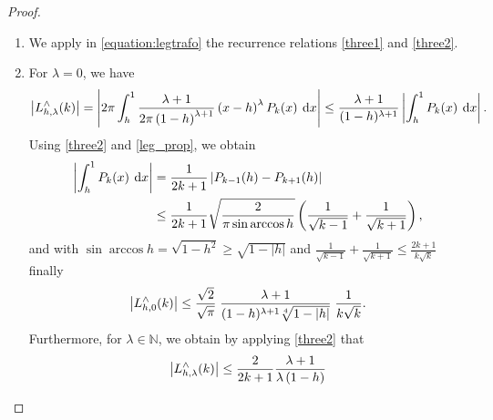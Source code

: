 \documentclass[11pt,a4paper,twoside,bibtotoc]{scrartcl}
\theoremstyle{plain}
\theoremstyle{definition}
\theoremstyle{remark}
\newcommand{\N}{\ensuremath{\mathbb{N}}}
\newcommand{\fun}[2]{\ensuremath{#1{\hspace{-0.4ex}}\left(#2\right)}}
\newcommand{\dx}{\text{\rm{d}}}
\numberwithin{equation}{section}
\numberwithin{table}{section}
\numberwithin{figure}{section}
\begin{document}
\begin{proof}
  ${}^{}$\\[-2ex]
  \begin{enumerate}
  \item We apply in \eqref{equation:legtrafo} the recurrence relations \eqref{three1} and \eqref{three2}.
  \item For $\lambda=0$, we have
    \begin{equation*}
      \left|\fun{L_{h,\lambda}^{\wedge}}{k}\right| 
      = \left| 2\pi \int_{h}^1 \frac{\lambda+1}{2\pi\left(1-h\right)^{\lambda+1}}
        \left(x-h\right)^{\lambda} \fun{P_{k}}{x} \: \dx x\right| 
      \le \frac{\lambda+1}{(1-h)^{\lambda+1}}\left|\int_{h}^1 \fun{P_{k}}{x} \: \dx x\right|.
    \end{equation*}
    Using \eqref{three2} and \eqref{leg_prop}, we obtain
    \begin{align*}
      \left|\int_{h}^1 \fun{P_{k}}{x} \: \dx x\right|
      & = \frac{1}{2k+1}
          \left|\fun{P_{k-1}}{h} - \fun{P_{k+1}}{h}\right|\\
      & \le \frac{1}{2k+1} \sqrt{\frac{2}{\pi \sin\arccos h}} \left(\frac{1}{\sqrt{k-1}} + \frac{1}{\sqrt{k+1}}\right),
    \end{align*}
    and with $\sin\arccos h = \sqrt{1-h^2} \ge \sqrt{1-|h|}$ and
    $\frac{1}{\sqrt{k-1}} + \frac{1}{\sqrt{k+1}} \le
    \frac{2k+1}{k\sqrt{k}}$ finally
    \begin{equation}
      \label{SmallLambda}
      \left|\fun{L_{h,0}^{\wedge}}{k}\right| \le 
      \frac{\sqrt{2}}{\sqrt{\pi}}\;
      \frac{\lambda+1}{(1-h)^{\lambda+1}\sqrt[4]{1-|h|}}\;
      \frac{1}{k\sqrt{k}}.
    \end{equation}
    Furthermore, for $\lambda \in \N$, we obtain by applying \eqref{three2} that
    \begin{equation*}
      \left|\fun{L_{h,\lambda}^{\wedge}}{k}\right| 
      \le \frac{2}{2k+1} \frac{\lambda+1}{\lambda\left(1-h\right)}

\end{equation*}
\end{enumerate}
\end{proof}
\end{document}
